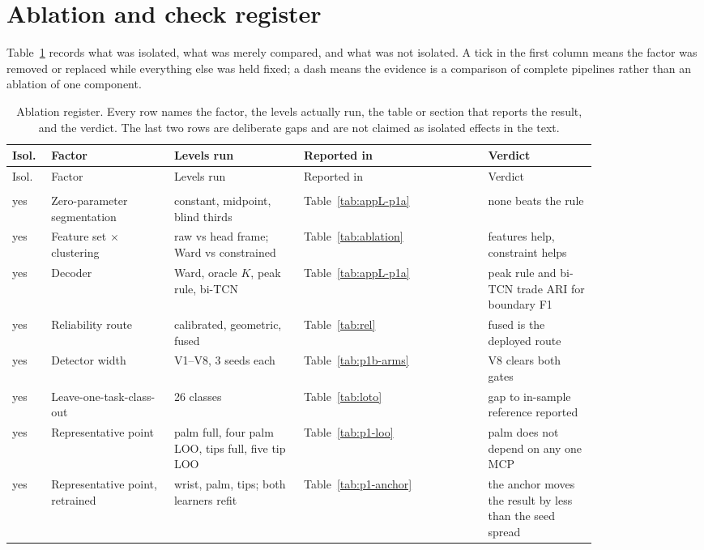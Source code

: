 \section{Ablation and check register}
\label{app:ablation}

Table~\ref{tab:ablation-register} records what was isolated, what was merely compared,
and what was not isolated. A tick in the first column means the factor was removed or
replaced while everything else was held fixed; a dash means the evidence is a comparison
of complete pipelines rather than an ablation of one component.

\begin{longtable}{p{0.04\linewidth}p{0.18\linewidth}p{0.19\linewidth}p{0.27\linewidth}p{0.16\linewidth}}
\caption{Ablation register. Every row names the factor, the levels actually run, the
table or section that reports the result, and the verdict. The last two rows are
deliberate gaps and are not claimed as isolated effects in the text.}
\label{tab:ablation-register}\\
\toprule
Isol. & Factor & Levels run & Reported in & Verdict \\
\midrule
\endfirsthead
\toprule
Isol. & Factor & Levels run & Reported in & Verdict \\
\midrule
\endhead
\bottomrule
\endfoot
\multicolumn{5}{l}{\emph{Problem 1}}\\
yes & Zero-parameter segmentation & constant, midpoint, blind thirds & Table~\ref{tab:appL-p1a} & none beats the rule \\
yes & Feature set $\times$ clustering & raw vs head frame; Ward vs constrained & Table~\ref{tab:ablation} & features help, constraint helps \\
yes & Decoder & Ward, oracle $K$, peak rule, bi-TCN & Table~\ref{tab:appL-p1a} & peak rule and bi-TCN trade ARI for boundary F1 \\
yes & Reliability route & calibrated, geometric, fused & Table~\ref{tab:rel} & fused is the deployed route \\
yes & Detector width & V1--V8, 3 seeds each & Table~\ref{tab:p1b-arms} & V8 clears both gates \\
yes & Leave-one-task-class-out & 26 classes & Table~\ref{tab:loto} & gap to in-sample reference reported \\
yes & Representative point & palm full, four palm LOO, tips full, five tip LOO & Table~\ref{tab:p1-loo} & palm does not depend on any one MCP \\
yes & Representative point, retrained & wrist, palm, tips; both learners refit & Table~\ref{tab:p1-anchor} & the anchor moves the result by less than the seed spread \\

\end{longtable}

